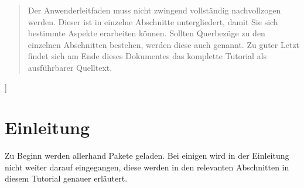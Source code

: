 \documentclass[%
  english,ngerman,%
  geometry=no,DIV=12,automark,%
]{tudscrartcl}
\begin{document}
\begin{abstract}
  Der Anwenderleitfaden muss nicht zwingend vollständig nachvollzogen werden. 
  Dieser ist in einzelne Abschnitte untergliedert, damit Sie sich bestimmte 
  Aspekte erarbeiten können. Sollten Querbezüge zu den einzelnen Abschnitten 
  bestehen, werden diese auch genannt. Zu guter Letzt findet sich am Ende 
  dieses Dokumentes das komplette Tutorial als ausführbarer Quelltext. 
  \end{abstract}
]
\tableofcontents
\listoffigures
\listoftables



\section{Einleitung}
\label{sec:introduction}
Zu Beginn werden allerhand Pakete geladen. Bei einigen wird in der Einleitung 
nicht weiter darauf eingegangen, diese werden in den relevanten Abschnitten in 
diesem Tutorial genauer erläutert. 
\end{document}
